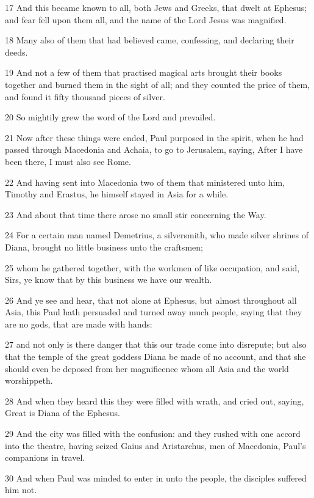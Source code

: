 \par 17 And this became known to all, both Jews and Greeks, that dwelt at Ephesus; and fear fell upon them all, and the name of the Lord Jesus was magnified.
\par 18 Many also of them that had believed came, confessing, and declaring their deeds.
\par 19 And not a few of them that practised magical arts brought their books together and burned them in the sight of all; and they counted the price of them, and found it fifty thousand pieces of silver.
\par 20 So mightily grew the word of the Lord and prevailed.
\par 21 Now after these things were ended, Paul purposed in the spirit, when he had passed through Macedonia and Achaia, to go to Jerusalem, saying, After I have been there, I must also see Rome.
\par 22 And having sent into Macedonia two of them that ministered unto him, Timothy and Erastus, he himself stayed in Asia for a while.
\par 23 And about that time there arose no small stir concerning the Way.
\par 24 For a certain man named Demetrius, a silversmith, who made silver shrines of Diana, brought no little business unto the craftsmen;
\par 25 whom he gathered together, with the workmen of like occupation, and said, Sirs, ye know that by this business we have our wealth.
\par 26 And ye see and hear, that not alone at Ephesus, but almost throughout all Asia, this Paul hath persuaded and turned away much people, saying that they are no gods, that are made with hands:
\par 27 and not only is there danger that this our trade come into disrepute; but also that the temple of the great goddess Diana be made of no account, and that she should even be deposed from her magnificence whom all Asia and the world worshippeth.
\par 28 And when they heard this they were filled with wrath, and cried out, saying, Great is Diana of the Ephesus.
\par 29 And the city was filled with the confusion: and they rushed with one accord into the theatre, having seized Gaius and Aristarchus, men of Macedonia, Paul's companions in travel.
\par 30 And when Paul was minded to enter in unto the people, the disciples suffered him not.
